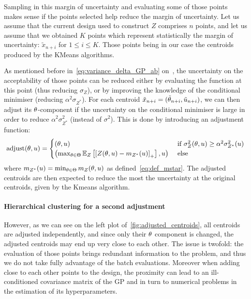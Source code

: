\documentclass[../../Main_ManuscritThese.tex]{subfiles}
\begin{document}
Sampling in this margin of uncertainty and evaluating some of those
points makes sense if the points selected help reduce the margin of
uncertainty.  Let us assume that the current design used to construct
$Z$ comprises $n$ points, and let us assume that we obtained $K$
points which represent statistically the margin of uncertainty:
$\tilde{x}_{n+i}$ for $1\leq i\leq K$. Those points being in our case
the centroids produced by the KMeans algorithms.


As mentioned before in~\cref{eq:variance_delta_GP_ab}
on~, the uncertainty on the
acceptability of those points can be reduced either by evaluating the
function at this point (thus reducing $\sigma_Z$), or by improving the
knowledge of the conditional minimiser (reducing
$\alpha^2 \sigma_{Z^*}$). For each centroid
$\tilde{x}_{n+i} = (\tilde{\theta}_{n+i}, \tilde{u}_{n+i})$, we can
then adjust its $\theta$-component if the uncertainty on the conditional
minimiser is large in order to reduce $\alpha^2 \sigma_{Z^*}^2$
(instead of $\sigma^2$). This is done by introducing an adjustment
function:
\begin{equation}
  \label{eq:adjust_centroid}
  \mathrm{adjust}(\theta,u) =
  \begin{cases}
    (\theta, u) & \text{ if }\sigma^2_Z(\theta, u) \geq \alpha^2\sigma^2_{Z^*}(u)\\
    \left(\max_{\theta\in\Theta} \mathbb{E}_Z\left[\left[Z(\theta,u) - m_{{Z^*}}(u)\right]_+ \right], u \right) & \text{ else}
  \end{cases}
\end{equation}
where $m_{{Z^*}}(u) = \min_{\theta\in\Theta} m_Z(\theta, u)$ as
defined~\eqref{eq:def_mstar}.  The adjusted centroids are then
expected to reduce the most the uncertainty at the original centroids,
given by the Kmeans algorithm.

\paragraph{Hierarchical clustering for a second adjustment}
However, as we can see on the left plot
of~\cref{fig:adjusted_centroids}, all centroids are adjusted
independently, and since only their $\theta$ component is changed, the
adjusted centroids may end up very close to each other. The issue is
twofold: the evaluation of those points brings redundant information
to the problem, and thus we do not take fully advantage of the batch
evaluations. Moreover when adding close to each other points to the
design, the proximity can lead to an ill-conditioned covariance matrix
of the GP and in turn to numerical problems in the estimation of its
hyperparameters.
\end{document}
